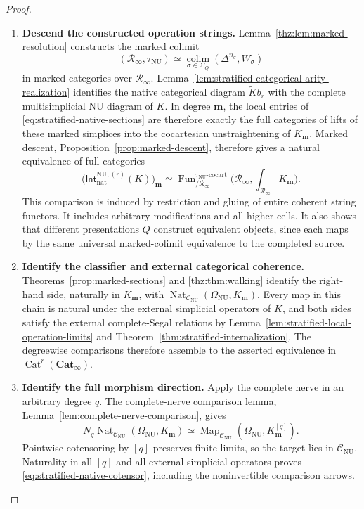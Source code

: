 \documentclass[oneside]{article}
\theoremstyle{plain}
\theoremstyle{definition}
\theoremstyle{remark}
\newcommand{\CNU}{\mathcal C_{\mathrm{NU}}}
\newcommand{\Cat}{\mathbf{Cat}_{\infty}}
\newcommand{\Fun}{\operatorname{Fun}}
\newcommand{\Map}{\operatorname{Map}}
\newcommand{\NU}{\mathrm{NU}}
\newcommand{\Nat}{\operatorname{Nat}}
\newcommand{\RNU}{\mathcal R_{\infty}}
\newcommand{\coc}{\mathrm{cocart}}
\begin{document}
\begin{proof}
\leavevmode
\begin{enumerate}
\item \textbf{Descend the constructed operation strings.}
Lemma~\ref{thz:lem:marked-resolution} constructs the marked colimit
\[
 (\RNU,\tau_{\NU})
 \simeq\operatorname*{colim}_{\sigma\in\Sigma_Q}
    (\Delta^{n_\sigma},W_\sigma)
\]
in marked categories over $\RNU$.  Lemma~\ref{lem:stratified-categorical-arity-realization} identifies
the native categorical diagram $\widetilde K b_r$ with the
complete multisimplicial NU diagram of $K$.  In degree
$\mathbf m$, the local entries of
\eqref{eq:stratified-native-sections} are therefore exactly the
full categories of lifts of these marked simplices into the
cocartesian unstraightening of $K_{\mathbf m}$.  Marked descent,
Proposition~\ref{prop:marked-descent}, therefore gives a natural
equivalence of full categories
\[
 \bigl(\mathsf{Int}^{\NU,(r)}_{\mathrm{nat}}(K)\bigr)_{\mathbf m}
 \simeq
 \Fun_{/\RNU}^{\tau_{\NU}\text{-}\coc}
 \bigl(\RNU,\textstyle\int_{\RNU}K_{\mathbf m}\bigr).
\]
This comparison is induced by restriction and gluing of entire
coherent string functors.  It includes arbitrary modifications and
all higher cells.  It also shows that different presentations $Q$
construct equivalent objects, since each maps by the same universal
marked-colimit equivalence to the completed source.
\item \textbf{Identify the classifier and external categorical coherence.}
Theorems~\ref{prop:marked-sections} and
\ref{thz:thm:walking} identify the right-hand side, naturally
in $K_{\mathbf m}$, with
$\Nat_{\CNU}(\Omega_{\NU},K_{\mathbf m})$.
Every map in this chain is natural under the external simplicial
operators of $K$, and both sides satisfy the external complete-Segal
relations by Lemma~\ref{lem:stratified-local-operation-limits} and
Theorem~\ref{thm:stratified-internalization}.  The degreewise
comparisons therefore assemble to the asserted equivalence in
$\operatorname{Cat}^r(\Cat)$.
\item \textbf{Identify the full morphism direction.}
Apply the complete nerve in an arbitrary degree $q$.  The
complete-nerve comparison lemma, Lemma~\ref{lem:complete-nerve-comparison},
gives
\[
 N_q\Nat_{\CNU}(\Omega_{\NU},K_{\mathbf m})
 \simeq
 \Map_{\CNU}(\Omega_{\NU},K_{\mathbf m}^{[q]}).
\]
Pointwise cotensoring by $[q]$ preserves finite limits, so the
target lies in $\CNU$.  Naturality in all $[q]$ and all external
simplicial operators proves \eqref{eq:stratified-native-cotensor},
including the noninvertible comparison arrows.

\end{enumerate}
\end{proof}
\end{document}
